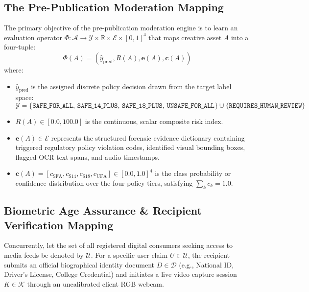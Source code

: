 \documentclass[12pt,a4paper]{report}
\begin{document}
\subsection{The Pre-Publication Moderation Mapping}
The primary objective of the pre-publication moderation engine is to learn an evaluation operator $\Phi: \mathcal{A} \rightarrow \mathcal{Y} \times \mathbb{R} \times \mathcal{E} \times [0, 1]^4$ that maps creative asset $A$ into a four-tuple:
\begin{equation}
\Phi(A) = \left( \hat{y}_{\text{pred}}, R(A), \mathbf{e}(A), \mathbf{c}(A) \right)
\end{equation}
where:
\begin{itemize}
    \item $\hat{y}_{\text{pred}}$ is the assigned discrete policy decision drawn from the target label space:
    \begin{equation}
    \mathcal{Y} = \{\texttt{SAFE\_FOR\_ALL},\, \texttt{SAFE\_14\_PLUS},\, \texttt{SAFE\_18\_PLUS},\, \texttt{UNSAFE\_FOR\_ALL}\} \cup \{\texttt{REQUIRES\_HUMAN\_REVIEW}\}
    \end{equation}
    \item $R(A) \in [0.0, 100.0]$ is the continuous, scalar composite risk index.
    \item $\mathbf{e}(A) \in \mathcal{E}$ represents the structured forensic evidence dictionary containing triggered regulatory policy violation codes, identified visual bounding boxes, flagged OCR text spans, and audio timestamps.
    \item $\mathbf{c}(A) = [c_{\text{SFA}}, c_{\text{S14}}, c_{\text{S18}}, c_{\text{UFA}}] \in [0.0, 1.0]^4$ is the class probability or confidence distribution over the four policy tiers, satisfying $\sum_{k} c_k = 1.0$.
\end{itemize}

\subsection{Biometric Age Assurance \& Recipient Verification Mapping}
Concurrently, let the set of all registered digital consumers seeking access to media feeds be denoted by $\mathcal{U}$. For a specific user claim $U \in \mathcal{U}$, the recipient submits an official biographical identity document $D \in \mathcal{D}$ (e.g., National ID, Driver's License, College Credential) and initiates a live video capture session $K \in \mathcal{K}$ through an uncalibrated client RGB webcam.
\end{document}
